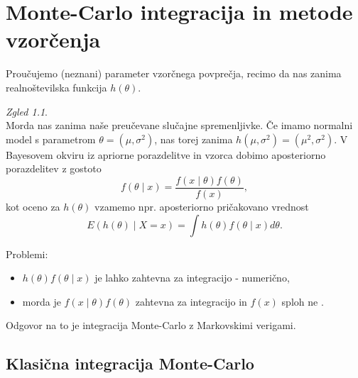 \documentclass[a4paper, 12pt]{book}
\theoremstyle{definition}
\theoremstyle{remark}
\newtheorem*{exmp}{Zgled}
\begin{document}

\chapter{Monte-Carlo integracija in metode vzorčenja}


Proučujemo (neznani) parameter vzorčnega povprečja, recimo da nas zanima realnoštevilska funkcija $h(\theta)$.
\begin{exmp} \text{} \\
  Morda nas zanima  naše preučevane slučajne spremenljivke.
  Če imamo normalni model s parametrom $\theta = (\mu, \sigma^2)$, nas torej zanima $h(\mu, \sigma^2) = (\mu^2, \sigma^2)$.
  V Bayesovem okviru iz apriorne porazdelitve in vzorca dobimo aposteriorno porazdelitev z gostoto
  \begin{equation*}
    f(\theta \mid x) = \frac{f(x \mid \theta) f(\theta)}{f(x)},
  \end{equation*}
  kot oceno za $h(\theta)$ vzamemo npr. aposteriorno pričakovano vrednost
  \begin{equation*}
    E(h(\theta) \mid X = x) = \int h(\theta) f(\theta \mid x) d\theta.
  \end{equation*}
\end{exmp}
Problemi:
\begin{itemize}
  \item $h(\theta) f(\theta \mid x)$ je lahko zahtevna za integracijo - numerično,
  \item morda je  $f(x \mid \theta) f(\theta)$ zahtevna za integracijo in $f(x)$ sploh ne .
\end{itemize}
Odgovor na to je integracija Monte-Carlo z Markovskimi verigami.


\section{Klasična integracija Monte-Carlo}
\end{document}
